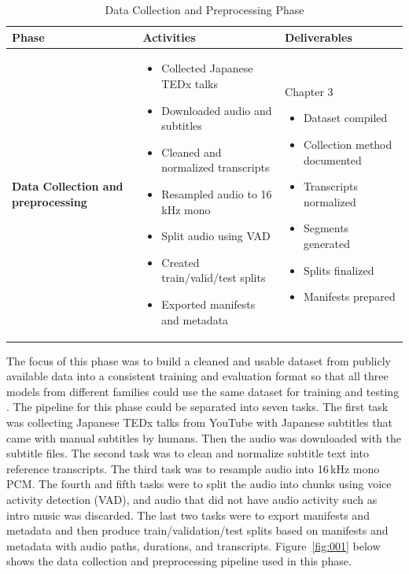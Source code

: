 \begin{table}[H]
\centering
\caption{Data Collection and Preprocessing Phase}
\label{tab:DataCollection}
{\small
\setlength{\tabcolsep}{6pt}
\renewcommand{\arraystretch}{1.5}

\begin{tabular}{ p{2.8cm}  p{5.3cm}  p{5.3cm}  }
\hline
\textbf{Phase} & \textbf{Activities} & \textbf{Deliverables} \\
\hline 

\textbf{Data Collection and preprocessing} &
\begin{itemize}[leftmargin=*, nosep]
  \item Collected Japanese TEDx talks
  \item Downloaded audio and subtitles
  \item Cleaned and normalized transcripts
  \item Resampled audio to 16 kHz mono
  \item Split audio using VAD
  \item Created train/valid/test splits
  \item Exported manifests and metadata
\end{itemize}
&
Chapter 3
\begin{itemize}[leftmargin=*, nosep]
  \item Dataset compiled
  \item Collection method documented
  \item Transcripts normalized
  \item Segments generated
  \item Splits finalized
  \item Manifests prepared
\end{itemize}
\\ \hline

\end{tabular}}
\end{table}

The focus of this phase was to build a cleaned and usable dataset from publicly available data into a consistent training and evaluation format so that all three models from different families could use the same dataset for training and testing \parencite{ando2021}. The pipeline for this phase could be separated into seven tasks. The first task was collecting Japanese TEDx talks from YouTube with Japanese subtitles that came with manual subtitles by humans. Then the audio was downloaded with the subtitle files. The second task was to clean and normalize subtitle text into reference transcripts. The third task was to resample audio into 16\,kHz mono PCM. The fourth and fifth tasks were to split the audio into chunks using voice activity detection (VAD), and audio that did not have audio activity such as intro music was discarded. The last two tasks were to export manifests and metadata and then produce train/validation/test splits based on manifests and metadata with audio paths, durations, and transcripts. Figure~\ref{fig:001} below shows the data collection and preprocessing pipeline used in this phase.

